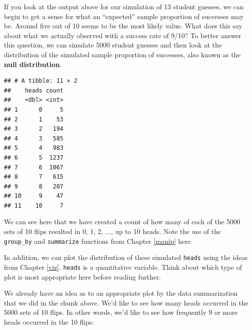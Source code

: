 \documentclass[]{tufte-book}
\newenvironment{Shaded}{\begin{snugshade}}{\end{snugshade}}
\newcommand{\KeywordTok}[1]{\textcolor[rgb]{0.13,0.29,0.53}{\textbf{{#1}}}}
\newcommand{\DataTypeTok}[1]{\textcolor[rgb]{0.13,0.29,0.53}{{#1}}}
\newcommand{\DecValTok}[1]{\textcolor[rgb]{0.00,0.00,0.81}{{#1}}}
\newcommand{\StringTok}[1]{\textcolor[rgb]{0.31,0.60,0.02}{{#1}}}
\newcommand{\NormalTok}[1]{{#1}}
\begin{document}
If you look at the output above for our simulation of 13 student
guesses, we can begin to get a sense for what an ``expected'' sample
proportion of successes may be. Around five out of 10 seems to be the
most likely value. What does this say about what we actually observed
with a success rate of 9/10? To better answer this question, we can
simulate 5000 student guesses and then look at the distribution of the
simulated sample proportion of successes, also known as the \textbf{null
distribution}.

\begin{Shaded}
\end{Shaded}

\begin{verbatim}
## # A tibble: 11 × 2
##    heads count
##    <dbl> <int>
## 1      0     5
## 2      1    53
## 3      2   194
## 4      3   585
## 5      4   983
## 6      5  1237
## 7      6  1067
## 8      7   615
## 9      8   207
## 10     9    47
## 11    10     7
\end{verbatim}

We can see here that we have created a count of how many of each of the
5000 sets of 10 flips resulted in 0, 1, 2, \(\ldots\), up to 10 heads.
Note the use of the \texttt{group\_by} and \texttt{summarize} functions
from Chapter \ref{manip} here.

In addition, we can plot the distribution of these simulated
\texttt{heads} using the ideas from Chapter \ref{viz}. \texttt{heads} is
a quantitative variable. Think about which type of plot is most
appropriate here before reading further.

We already have an idea as to an appropriate plot by the data
summarization that we did in the chunk above. We'd like to see how many
heads occurred in the 5000 sets of 10 flips. In other words, we'd like
to see how frequently 9 or more heads occurred in the 10 flips:

\begin{Shaded}
\end{Shaded}
\end{document}
